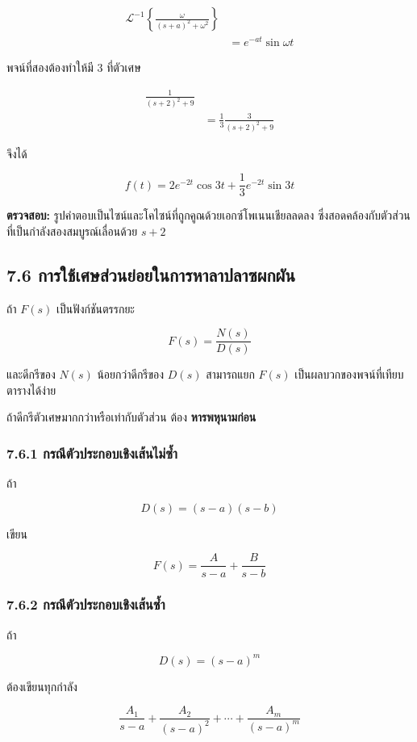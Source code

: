 \[
\begin{aligned}
    \mathcal{L}^{-1}\left\{\frac{\omega}{(s+a)^2+\omega^2}\right\}&\\
    &=e^{-at}\sin\omega t
\end{aligned}
\]

พจน์ที่สองต้องทำให้มี $3$ ที่ตัวเศษ

\[
\begin{aligned}
    \frac{1}{(s+2)^2+9}&\\
    &=\frac{1}{3}\frac{3}{(s+2)^2+9}
\end{aligned}
\]

จึงได้

\[
\boxed{f(t)=2e^{-2t}\cos 3t+\frac{1}{3}e^{-2t}\sin 3t}
\]

\textbf{ตรวจสอบ:} รูปคำตอบเป็นไซน์และโคไซน์ที่ถูกคูณด้วยเอกซ์โพเนนเชียลลดลง ซึ่งสอดคล้องกับตัวส่วนที่เป็นกำลังสองสมบูรณ์เลื่อนด้วย $s+2$



\subsection{7.6 การใช้เศษส่วนย่อยในการหาลาปลาซผกผัน}

ถ้า $F(s)$ เป็นฟังก์ชันตรรกยะ

\[
F(s)=\frac{N(s)}{D(s)}
\]

และดีกรีของ $N(s)$ น้อยกว่าดีกรีของ $D(s)$ สามารถแยก $F(s)$ เป็นผลบวกของพจน์ที่เทียบตารางได้ง่าย

ถ้าดีกรีตัวเศษมากกว่าหรือเท่ากับตัวส่วน ต้อง \textbf{หารพหุนามก่อน}

\subsubsection{7.6.1 กรณีตัวประกอบเชิงเส้นไม่ซ้ำ}

ถ้า

\[
D(s)=(s-a)(s-b)
\]

เขียน

\[
F(s)=\frac{A}{s-a}+\frac{B}{s-b}
\]

\subsubsection{7.6.2 กรณีตัวประกอบเชิงเส้นซ้ำ}

ถ้า

\[
D(s)=(s-a)^m
\]

ต้องเขียนทุกกำลัง

\[
\frac{A_1}{s-a}+\frac{A_2}{(s-a)^2}+\cdots+\frac{A_m}{(s-a)^m}
\]

